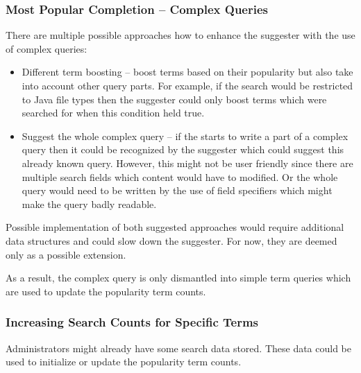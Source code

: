\subsubsection{Most Popular Completion – Complex Queries}
\label{previous_searches}
There are multiple possible approaches how to enhance the suggester with the use of complex queries:
\begin{itemize}
    \item Different term boosting – boost terms based on their popularity but also take into account other
    query parts. For example, if the search would be restricted to Java file types then the suggester could
    only boost terms which were searched for when this condition held true.
    \item Suggest the whole complex query – if the starts to write a part of a complex query then it could be recognized
    by the suggester which could suggest this already known query. However, this might not be user friendly since there
    are multiple search fields which content would have to modified. Or the whole query would need to be written by the
    use of field specifiers which might make the query badly readable.
\end{itemize}

Possible implementation of both suggested approaches would require additional data structures and could slow down the
suggester. For now, they are deemed only as a possible extension.

As a result, the complex query is only dismantled into simple term queries which are used to update the popularity term counts.

\subsubsection{Increasing Search Counts for Specific Terms}
\label{increasing_search_counts}
Administrators might already have some search data stored. These data could be used to initialize or update the
popularity term counts.

